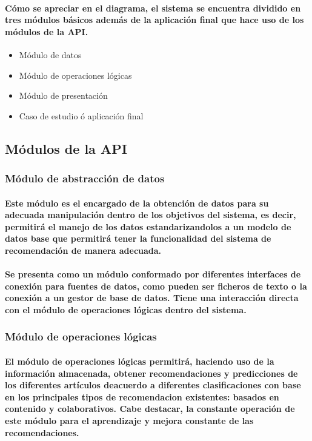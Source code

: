 \paragraph{Cómo se apreciar en el diagrama, el sistema se encuentra dividido en tres módulos básicos además de la aplicación final que hace uso de los módulos de la API.}
    \begin{itemize}
    \item Módulo de datos
    \item Módulo de operaciones lógicas
    \item Módulo de presentación
    \item Caso de estudio ó aplicación final
  \end{itemize}

\subsection{Módulos de la API}
  \subsubsection{Módulo de abstracción de datos}
    \paragraph{Este módulo es el encargado de la obtención de datos para su adecuada manipulación dentro de los objetivos del sistema, es decir, permitirá el manejo de los datos estandarizandolos a un modelo de datos base que permitirá tener la funcionalidad del sistema de recomendación de manera adecuada. }
    \paragraph{Se presenta como un módulo conformado por diferentes interfaces de conexión para fuentes de datos, como pueden ser ficheros de texto o la conexión a un gestor de base de datos. Tiene una interacción directa con el módulo de operaciones lógicas dentro del sistema.}

  \subsubsection{Módulo de operaciones lógicas}
    \paragraph{El módulo de operaciones lógicas permitirá, haciendo uso de la información almacenada, obtener recomendaciones y predicciones de los diferentes artículos deacuerdo a diferentes clasificaciones con base en los principales tipos de recomendacion existentes: basados en contenido y colaborativos. Cabe destacar, la constante operación de este módulo para el aprendizaje y mejora constante de las recomendaciones.}

